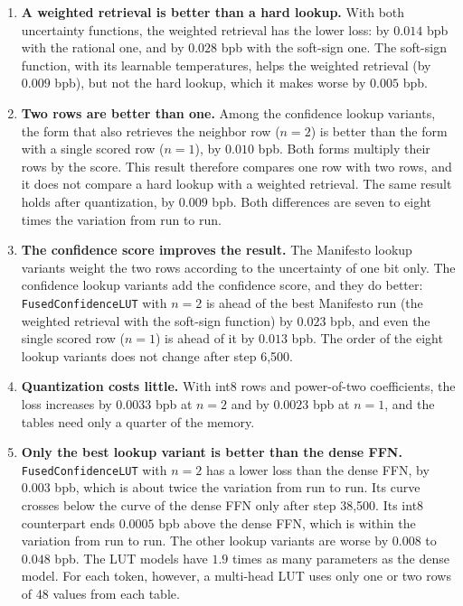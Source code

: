 \documentclass[11pt]{article}
\DeclareRobustCommand{\code}[1]{{\renewcommand{\_}{\textunderscore\allowbreak}\texttt{#1}}}
\begin{document}
\begin{enumerate}\itemsep0pt
\item \textbf{A weighted retrieval is better than a hard lookup.} With both uncertainty functions, the
  weighted retrieval has the lower loss: by $0.014$ bpb with the rational one, and by $0.028$ bpb with the
  soft-sign one. The soft-sign function, with its learnable temperatures, helps the weighted retrieval (by $0.009$ bpb), but not
  the hard lookup, which it makes worse by $0.005$ bpb.
\item \textbf{Two rows are better than one.} Among the confidence lookup variants, the form that also
  retrieves the neighbor row ($n=2$) is better than the form with a single scored row ($n=1$), by $0.010$
  bpb. Both forms multiply their rows by the score. This result therefore compares one row with two rows,
  and it does not compare a hard lookup with a weighted retrieval. The same result holds after
  quantization, by $0.009$ bpb. Both differences are seven to eight times the variation from run to run.
\item \textbf{The confidence score improves the result.} The Manifesto lookup variants weight the two rows
  according to the uncertainty of one bit only. The confidence lookup variants add the confidence score,
  and they do better: \code{FusedConfidenceLUT} with $n=2$ is ahead of the best Manifesto run (the weighted
  retrieval with the soft-sign function) by $0.023$ bpb, and even the single scored row ($n=1$) is ahead
  of it by $0.013$ bpb. The order of the eight lookup variants does not change after step 6{,}500.
\item \textbf{Quantization costs little.} With int8 rows and power-of-two coefficients, the loss
  increases by $0.0033$ bpb at $n=2$ and by $0.0023$ bpb at $n=1$, and the tables need only a quarter of
  the memory.
\item \textbf{Only the best lookup variant is better than the dense FFN.} \code{FusedConfidenceLUT} with
  $n=2$ has a lower loss than the dense FFN, by $0.003$ bpb, which is about twice the variation from run
  to run. Its curve crosses below the curve of the dense FFN only after step 38{,}500. Its int8
  counterpart ends $0.0005$ bpb above the dense FFN, which is within the variation from run to run. The
  other lookup variants are worse by $0.008$ to $0.048$ bpb. The LUT models have $1.9$ times as many
  parameters as the dense model. For each token, however, a multi-head LUT uses only one or two rows of 48
  values from each table.
\end{enumerate}
\end{document}
